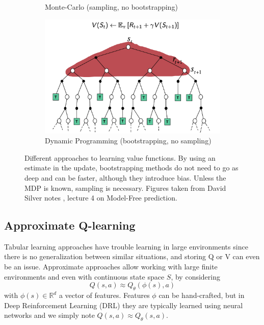 \begin{figure}[H]
\begin{subfigure}{0.3\textwidth}
        \caption{Monte-Carlo (sampling, no bootstrapping)}
        \label{fig:backup-mc}
    \end{subfigure}
    \begin{subfigure}{0.3\textwidth}
        \includegraphics[width=\linewidth]{figures/backup-dp.png}
        \caption{Dynamic Programming (bootstrapping, no sampling)}
        \label{fig:backup-dp}
    \end{subfigure}
    \caption{Different approaches to learning value functions. By using an estimate in the update, bootstrapping methods do not need to go as deep and can be faster, although they introduce bias. Unless the MDP is known, sampling is necessary. Figures taken from David Silver notes \cite{silver2015}, lecture 4 on Model-Free prediction.}
\end{figure}


\subsection{Approximate Q-learning}
Tabular learning approaches have trouble learning in large environments since there is no generalization between similar situations, and storing Q or V can even be an issue. Approximate approaches allow working with large finite environments and even with continuous state space $S$, by considering
\[
    Q(s,a) \approx Q_\theta(\phi(s),a)
\]
with $\phi(s) \in \mathbb{R}^d$ a vector of features. Features $\phi$ can be hand-crafted, but in Deep Reinforcement Learning (DRL) they are typically learned using neural networks and we simply note $Q(s,a) \approx Q_\theta(s,a)$.

